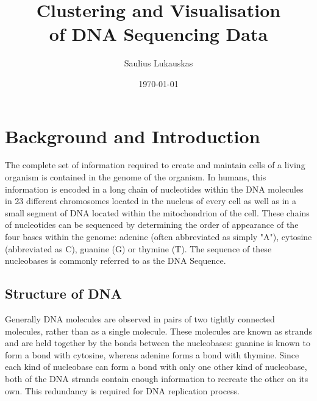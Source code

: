 \documentclass[parskip]{cs4rep}
\begin{document}
\title{Clustering and Visualisation\\ of DNA Sequencing Data}

\author{Saulius Lukauskas}


\date{\today}


\maketitle


\tableofcontents



\chapter{Background and Introduction}

The complete set of information required to create and maintain cells of a
living organism is contained in the genome of the organism. In humans, this
information is encoded in a long chain of nucleotides within the DNA molecules
in 23 different chromosomes located in the nucleus of every cell as well as in
a small segment of DNA located within the mitochondrion of the cell.  
These chains of nucleotides can be sequenced by determining the order of appearance
of the four bases within the genome: adenine (often abbreviated as simply "A"), cytosine (abbreviated as C),
guanine (G) or thymine (T).
The sequence of these nucleobases is commonly referred to as the DNA Sequence. 

\section{Structure of  DNA}
Generally DNA molecules are observed in pairs of two tightly connected
molecules, rather than as a single molecule. These molecules are known as
strands and are held together by the bonds between the nucleobases: guanine is
known to form a bond with cytosine, whereas adenine forms a bond with thymine.
Since each kind of nucleobase can form a bond with only one other kind of
nucleobase, both of the DNA strands contain enough information to recreate the
other on its own. This redundancy is required for DNA replication process. 
\end{document}
